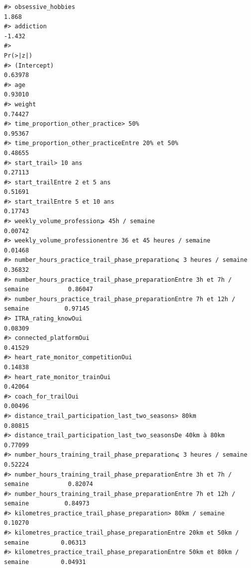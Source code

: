 \documentclass[
]{article}
\begin{document}
\begin{verbatim}
#> obsessive_hobbies                                                                1.868
#> addiction                                                                       -1.432
#>                                                                                Pr(>|z|)
#> (Intercept)                                                                     0.63978
#> age                                                                             0.93010
#> weight                                                                          0.74427
#> time_proportion_other_practice> 50%                                             0.95367
#> time_proportion_other_practiceEntre 20% et 50%                                  0.48655
#> start_trail> 10 ans                                                             0.27113
#> start_trailEntre 2 et 5 ans                                                     0.51691
#> start_trailEntre 5 et 10 ans                                                    0.17743
#> weekly_volume_profession⩾ 45h / semaine                                         0.00742
#> weekly_volume_professionentre 36 et 45 heures / semaine                         0.01468
#> number_hours_practice_trail_phase_preparation⩽ 3 heures / semaine               0.36832
#> number_hours_practice_trail_phase_preparationEntre 3h et 7h / semaine           0.86047
#> number_hours_practice_trail_phase_preparationEntre 7h et 12h / semaine          0.97145
#> ITRA_rating_knowOui                                                             0.08309
#> connected_platformOui                                                           0.41529
#> heart_rate_monitor_competitionOui                                               0.14838
#> heart_rate_monitor_trainOui                                                     0.42064
#> coach_for_trailOui                                                              0.00496
#> distance_trail_participation_last_two_seasons> 80km                             0.80815
#> distance_trail_participation_last_two_seasonsDe 40km à 80km                     0.77099
#> number_hours_training_trail_phase_preparation⩽ 3 heures / semaine               0.52224
#> number_hours_training_trail_phase_preparationEntre 3h et 7h / semaine           0.82074
#> number_hours_training_trail_phase_preparationEntre 7h et 12h / semaine          0.84973
#> kilometres_practice_trail_phase_preparation> 80km / semaine                     0.10270
#> kilometres_practice_trail_phase_preparationEntre 20km et 50km / semaine         0.06313
#> kilometres_practice_trail_phase_preparationEntre 50km et 80km / semaine         0.04931

\end{verbatim}
\end{document}
